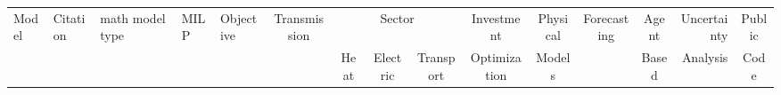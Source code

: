 \begin{tabular}{lllll*{8}{c}rc}
\toprule
Model &   Citation   &   math model type   &  MILP  &   Objective   & Transmission & \multicolumn{3}{c}{Sector}& Investment & Physical & Forecasting & Agent  &  Uncertainty& Public  \\ 
&  & & & & & Heat & Electric & Transport & Optimization & Models & & Based& Analysis& Code \\
\midrule

\end{tabular}

